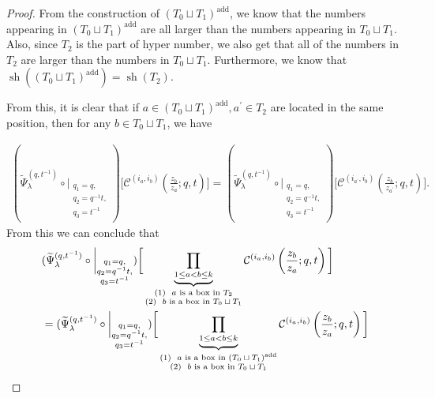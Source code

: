 \documentclass[12pt,reqno,a4paper]{amsart}
\newcommand{\comp}{\circ}
\newcommand{\cals}[1]{\mathcal{#1}}
\numberwithin{equation}{section}
\theoremstyle{definition}
\begin{document}
\begin{proof}
From the construction of $(T_0 \sqcup T_1)^{\operatorname{add}}$, we know that the numbers appearing in $(T_0 \sqcup T_1)^{\operatorname{add}}$ are all larger than the numbers appearing in $T_0 \sqcup T_1$. Also, since $T_2$ is the part of hyper number, we also get that all of the numbers in $T_2$ are larger than the numbers in $T_0 \sqcup T_1$. Furthermore, we know that $\operatorname{sh}((T_0 \sqcup T_1)^{\operatorname{add}}) = \operatorname{sh}(T_2)$. 

From this, it is clear that if $a \in (T_0 \sqcup T_1)^{\operatorname{add}}, a^\prime \in T_2$ are located in the same position, then for any $b \in T_0 \sqcup T_1$, we have 

\footnotesize
\begin{align}
	(
	\widetilde{\Psi}_{\lambda}^{(q,t^{-1})}
	\comp 
	\bigg|_{
		\substack{
			q_1 = q, \\
			q_2 = q^{-1}t,\\
			q_3 = t^{-1} \\
		}
	}
	)
	\Big[
	\cals{C}^{(i_a,i_b)}\left(
	\frac{z_b}{z_a}
	; q, t
	\right)
	\Big]
	=
	(
	\widetilde{\Psi}_{\lambda}^{(q,t^{-1})}
	\comp 
	\bigg|_{
		\substack{
			q_1 = q, \\
			q_2 = q^{-1}t,\\
			q_3 = t^{-1} \\
		}
	}
	)
	\Big[
	\cals{C}^{(i_{a^\prime},i_b)}\left(
	\frac{z_b}{z_{a^\prime}}
	; q, t
	\right)
	\Big].
\end{align}
\normalsize
From this we can conclude that 
\footnotesize
\begin{align}
	&(
	\widetilde{\Psi}_{\lambda}^{(q,t^{-1})}
	\comp 
	\bigg|_{
		\substack{
			q_1 = q, \\
			q_2 = q^{-1}t,\\
			q_3 = t^{-1} \\
		}
	}
	)
	\bigg[
	\underbrace{	\prod_{1 \leq a < b \leq k}				}_{
		\substack{
			(1) \,\, \text{ $a$ is a box in $T_2$}
			\\
			(2) \,\, \text{ $b$ is a box in $T_0 \sqcup T_1$}
		}
	}
	\cals{C}^{(i_a,i_b)}\left(
	\frac{z_b}{z_a}
	; q, t
	\right)
	\bigg]
	\\
	&= 
	(
	\widetilde{\Psi}_{\lambda}^{(q,t^{-1})}
	\comp 
	\bigg|_{
		\substack{
			q_1 = q, \\
			q_2 = q^{-1}t,\\
			q_3 = t^{-1} \\
		}
	}
	)
	\bigg[
	\underbrace{	\prod_{1 \leq a < b \leq k}				}_{
		\substack{
			(1) \,\, \text{ $a$ is a box in $(T_0 \sqcup T_1)^{\operatorname{add}}$}
			\\
			(2) \,\, \text{ $b$ is a box in $T_0 \sqcup T_1$}
		}
	}
	\cals{C}^{(i_a,i_b)}\left(
	\frac{z_b}{z_a}
	; q, t
	\right)
	\bigg]
	\notag 
\end{align}
\normalsize
\end{proof}
\end{document}
